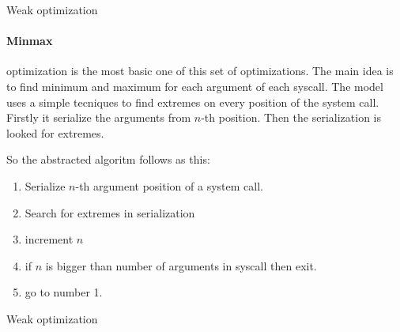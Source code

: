 	\begin{algorithm}[H]



		\caption{Weak optimization}\label{algo:weak}
	\end{algorithm}

	\paragraph{Minmax}
	optimization is the most basic one of this set of optimizations.
	The main idea is to find minimum and maximum for each argument of each syscall.
	The model uses a simple  tecniques to find extremes on every position of the system call.
	Firstly it serialize the arguments from $n$-th position. Then the serialization is
	looked for extremes.

	So the abstracted algoritm follows as this:
	\begin{enumerate}
		\item Serialize $n$-th argument position of a system call.
		\item Search for extremes in serialization
		\item increment $n$
		\item if $n$ is bigger than number of arguments in syscall then exit.
		\item go to number 1.
	\end{enumerate}

	\begin{algorithm}[H]



		\caption{Weak optimization}\label{algo:weak}
	\end{algorithm}

